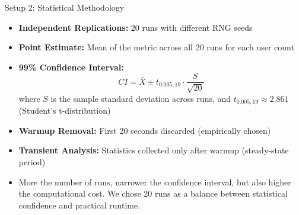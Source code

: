 \documentclass[10pt]{beamer}
\begin{document}
\begin{frame}{Setup 2: Statistical Methodology}
\small

\begin{itemize}
    \item \textbf{Independent Replications:} 20 runs with different RNG seeds

    \item \textbf{Point Estimate:} Mean of the metric across all 20 runs for each user count

    \item \textbf{99\% Confidence Interval:}
    \[
    CI = \bar{X} \pm t_{0.005,19} \cdot \frac{S}{\sqrt{20}}
    \]
    where $S$ is the sample standard deviation across runs, and 
    $t_{0.005,19} \approx 2.861$ (Student’s t-distribution)

    \item \textbf{Warmup Removal:} First 20 seconds discarded (empirically chosen)

    \item \textbf{Transient Analysis:} Statistics collected only after warmup (steady-state period)
    \item More the number of runs, narrower the confidence interval, but also higher the computational cost. We chose 20 runs as a balance between statistical confidence and practical runtime.
\end{itemize}

\end{frame}
\end{document}
